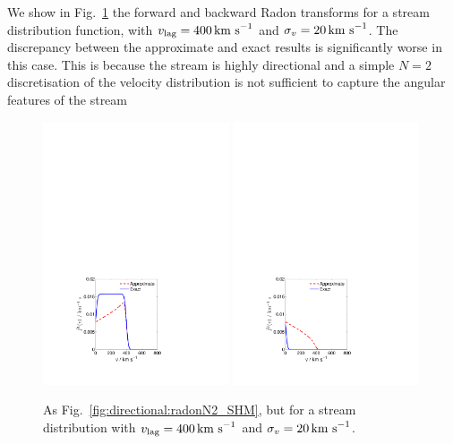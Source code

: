 We show in Fig.~\ref{fig:directional:radonN2_STREAM} the forward and backward Radon transforms for a stream distribution function, with $v_\textrm{lag} = 400 \,\textrm{km s}^{-1}$ and $\sigma_v = 20 \,\textrm{km s}^{-1}$. The discrepancy between the approximate and exact results is significantly worse in this case. This is because the stream is highly directional and a simple $N=2$ discretisation of the velocity distribution is not sufficient to capture the angular features of the stream

\begin{figure}[ht!]

  \centering
  \includegraphics[trim={3.5cm 2cm 7.5cm 17cm},clip,width=0.49\textwidth]{Directional/STREAM_N2_1.pdf}
  \includegraphics[trim={3.5cm 2cm 7.5cm 17cm},clip,width=0.49\textwidth]{Directional/STREAM_N2_2.pdf}

\caption[Exact and approximate integrated Radon transforms for $N=2$ components for a stream distribution function]{As Fig.~\ref{fig:directional:radonN2_SHM}, but for a stream distribution with $v_\textrm{lag} = 400 \,\textrm{km s}^{-1}$ and $\sigma_v = 20 \,\textrm{km s}^{-1}$.}
\label{fig:directional:radonN2_STREAM}
\end{figure}



